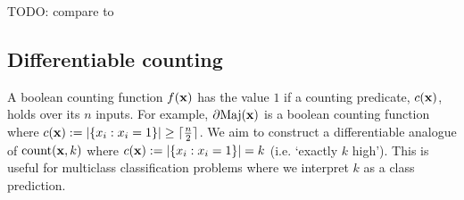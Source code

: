 \documentclass{article} %
\begin{document}
TODO: compare to \cite{NEURIPS2019_d8c24ca8}

\subsection{Differentiable counting}

A boolean counting function $f({\bf x})$ has the value $1$ if a counting predicate, $c({\bf x})$, holds over its $n$ inputs. For example, $\partial\!\operatorname{Maj}({\bf x})$ is a boolean counting function where $c({\bf x}) := |\{x_{i} : x_{i} = 1 \}| \geq \lceil \frac{n}{2} \rceil$. We aim to construct a differentiable analogue of $\operatorname{count}({\bf x}, k)$ where $c({\bf x}) := |\{x_{i} : x_{i} = 1 \}| = k$ (i.e. `exactly $k$ high'). This is useful for multiclass classification problems where we interpret $k$ as a class prediction.
\end{document}
